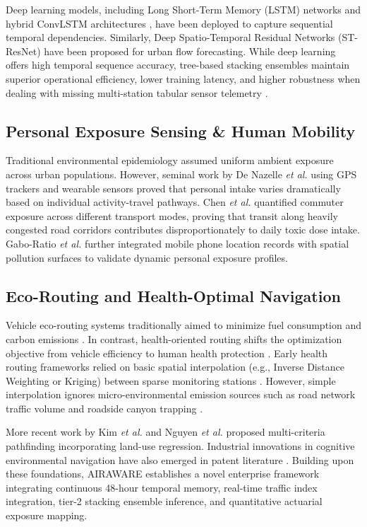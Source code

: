\documentclass[journal]{IEEEtran}
\begin{document}
Deep learning models, including Long Short-Term Memory (LSTM) networks and hybrid ConvLSTM architectures \cite{huang2021}, have been deployed to capture sequential temporal dependencies. Similarly, Deep Spatio-Temporal Residual Networks (ST-ResNet) \cite{zhang2017} have been proposed for urban flow forecasting. While deep learning offers high temporal sequence accuracy, tree-based stacking ensembles maintain superior operational efficiency, lower training latency, and higher robustness when dealing with missing multi-station tabular sensor telemetry \cite{kumar2023}.

\subsection{Personal Exposure Sensing \& Human Mobility}
Traditional environmental epidemiology assumed uniform ambient exposure across urban populations. However, seminal work by De Nazelle \textit{et al.} \cite{denazelle2013} using GPS trackers and wearable sensors proved that personal intake varies dramatically based on individual activity-travel pathways. Chen \textit{et al.} \cite{chen2019} quantified commuter exposure across different transport modes, proving that transit along heavily congested road corridors contributes disproportionately to daily toxic dose intake. Gabo-Ratio \textit{et al.} \cite{gabo2021} further integrated mobile phone location records with spatial pollution surfaces to validate dynamic personal exposure profiles.

\subsection{Eco-Routing and Health-Optimal Navigation}
Vehicle eco-routing systems traditionally aimed to minimize fuel consumption and carbon emissions \cite{huang2015}. In contrast, health-oriented routing shifts the optimization objective from vehicle efficiency to human health protection \cite{zheng2013}. Early health routing frameworks relied on basic spatial interpolation (e.g., Inverse Distance Weighting or Kriging) between sparse monitoring stations \cite{zheng2013}. However, simple interpolation ignores micro-environmental emission sources such as road network traffic volume and roadside canyon trapping \cite{keerthirathna2021}. 

More recent work by Kim \textit{et al.} \cite{kim2018} and Nguyen \textit{et al.} \cite{nguyen2020} proposed multi-criteria pathfinding incorporating land-use regression. Industrial innovations in cognitive environmental navigation have also emerged in patent literature \cite{us11022448, us10969238, us9874453}. Building upon these foundations, AIRAWARE establishes a novel enterprise framework integrating continuous 48-hour temporal memory, real-time traffic index integration, tier-2 stacking ensemble inference, and quantitative actuarial exposure mapping.
\end{document}
